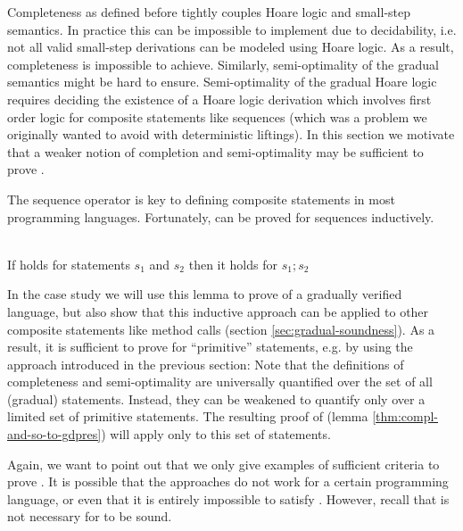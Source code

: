 Completeness as defined before tightly couples Hoare logic and small-step semantics.
In practice this can be impossible to implement due to decidability, i.e. not all valid small-step derivations can be modeled using Hoare logic.
As a result, completeness is impossible to achieve.
Similarly, semi-optimality of the gradual semantics might be hard to ensure.
Semi-optimality of the gradual Hoare logic requires deciding the existence of a Hoare logic derivation which involves first order logic for composite statements like sequences (which was a problem we originally wanted to avoid with deterministic liftings).
In this section we motivate that a weaker notion of completion and semi-optimality may be sufficient to prove .

The sequence operator \ttt{;} is key to defining composite statements in most programming languages.
Fortunately,  can be proved for sequences inductively.
\begin{lemma}
    \label{lemma:gdpres-seq}~\\
    If  holds for statements $s_1$ and $s_2$ then it holds for $s_1;s_2$
\end{lemma}

In the case study we will use this lemma to prove  of a gradually verified language, but also show that this inductive approach can be applied to other composite statements like method calls (section \ref{sec:gradual-soundness}).
As a result, it is sufficient to prove  for “primitive” statements, e.g. by using the approach introduced in the previous section:
Note that the definitions of completeness and semi-optimality are universally quantified over the set of all (gradual) statements.
Instead, they can be weakened to quantify only over a limited set of primitive statements.
The resulting proof of  (lemma \ref{thm:compl-and-so-to-gdpres}) will apply only to this set of statements.

Again, we want to point out that we only give examples of sufficient criteria to prove .
It is possible that the approaches do not work for a certain programming language, or even that it is entirely impossible to satisfy .
However, recall that  is not necessary for \gvl to be sound.